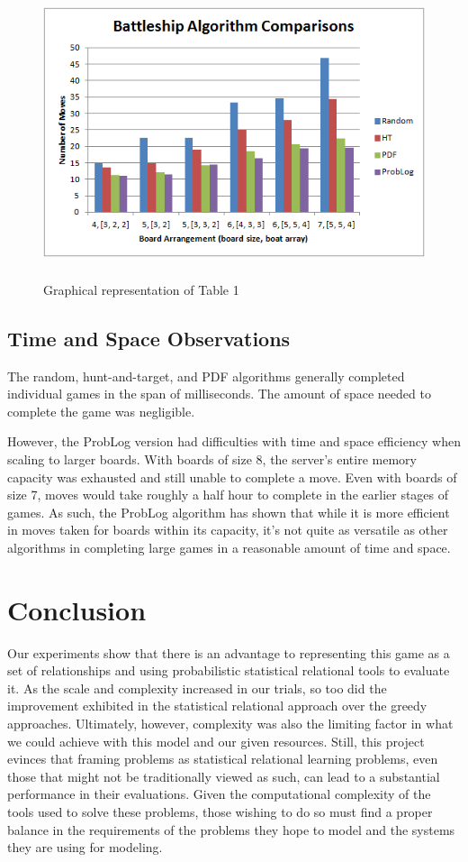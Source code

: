 \documentclass[]{article}
\begin{document}
\begin{figure}
	\centering
	\includegraphics[width=13cm, height=8.5cm]{chart}
	\captionsetup{justification=centering,margin=0.25cm}
	\caption{Graphical representation of Table 1}
\end{figure}

\subsection{Time and Space Observations}

The random, hunt-and-target, and PDF algorithms generally completed individual games in the span of milliseconds. The amount of space needed to complete the game was negligible.

However, the ProbLog version had difficulties with time and space efficiency when scaling to larger boards. With boards of size 8, the server's entire memory capacity was exhausted and still unable to complete a move. Even with boards of size 7, moves would take roughly a half hour to complete in the earlier stages of games. As such, the ProbLog algorithm has shown that while it is more efficient in moves taken for boards within its capacity, it's not quite as versatile as other algorithms in completing large games in a reasonable amount of time and space.

\section{Conclusion}

Our experiments show that there is an advantage to representing this game as a set of relationships and using probabilistic statistical relational tools to evaluate it. As the scale and complexity increased in our trials, so too did the improvement exhibited in the statistical relational approach over the greedy approaches.  Ultimately, however, complexity was also the limiting factor in what we could achieve with this model and our given resources.
Still, this project evinces that framing problems as statistical relational learning problems, even those that might not be traditionally viewed as such, can lead to a substantial performance in their evaluations.  Given the computational complexity of the tools used to solve these problems, those wishing to do so must find a proper balance in the requirements of the problems they hope to model and the systems they are using for modeling.
\end{document}
